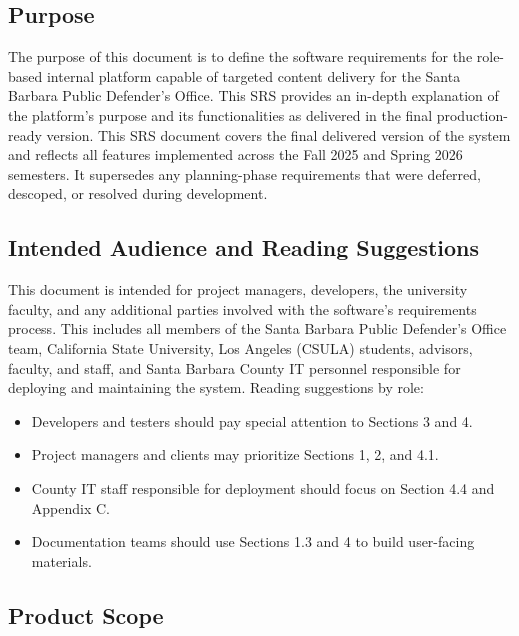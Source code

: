 \documentclass[12pt]{article}
\begin{document}
\subsection{Purpose}

The purpose of this document is to define the software requirements for the role-based internal platform capable of targeted content delivery for the Santa Barbara Public Defender's Office. This SRS provides an in-depth explanation of the platform's purpose and its functionalities as delivered in the final production-ready version. This SRS document covers the final delivered version of the system and reflects all features implemented across the Fall 2025 and Spring 2026 semesters. It supersedes any planning-phase requirements that were deferred, descoped, or resolved during development.

\subsection{Intended Audience and Reading Suggestions}

This document is intended for project managers, developers, the university faculty, and any additional parties involved with the software's requirements process. This includes all members of the Santa Barbara Public Defender's Office team, California State University, Los Angeles (CSULA) students, advisors, faculty, and staff, and Santa Barbara County IT personnel responsible for deploying and maintaining the system. Reading suggestions by role:

\begin{itemize}[leftmargin=*]
\item  Developers and testers should pay special attention to Sections 3 and 4.
\item  Project managers and clients may prioritize Sections 1, 2, and 4.1.
\item  County IT staff responsible for deployment should focus on Section 4.4 and Appendix C.
\item  Documentation teams should use Sections 1.3 and 4 to build user-facing materials.
\end{itemize}

\subsection{Product Scope}
\end{document}
